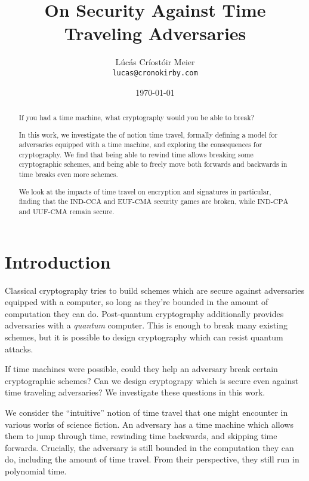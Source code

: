 

\date{\today}
\title{On Security Against Time Traveling Adversaries}
\author{Lúcás Críostóir Meier\\\texttt{lucas@cronokirby.com}}



\maketitle

\begin{abstract}
    \noindent If you had a time machine, what cryptography would you be able to break?

    In this work, we investigate the of notion time travel, formally defining a model for adversaries
    equipped with a time machine, and exploring the consequences
    for cryptography.
    We find that being able to rewind time allows breaking some
    cryptographic schemes, and being able to freely move both
    forwards and backwards in time breaks even more schemes.

    We look at the impacts of time travel on encryption and signatures in particular,
    finding that the $\text{IND-CCA}$ and $\text{EUF-CMA}$ security
    games are broken, while $\text{IND-CPA}$ and $\text{UUF-CMA}$
    remain secure.
\end{abstract}

\section{Introduction}

Classical cryptography tries to build schemes which are secure
against adversaries equipped with a computer, so long as they're
bounded in the amount of computation they can do.
Post-quantum cryptography additionally provides adversaries
with a \emph{quantum} computer.
This is enough to break many existing schemes, but it is possible to
design cryptography which can resist quantum attacks.

If time machines were possible, could they help an adversary break
certain cryptographic schemes? Can we design cryptograpy which
is secure even against time traveling adversaries?
We investigate these questions in this work.

We consider the ``intuitive'' notion of time travel that one might
encounter in various works of science fiction.
An adversary has a time machine which allows them to jump through
time, rewinding time backwards, and skipping time forwards.
Crucially, the adversary is still bounded in the computation
they can do, including the amount of time travel.
From their perspective, they still run in polynomial time.

